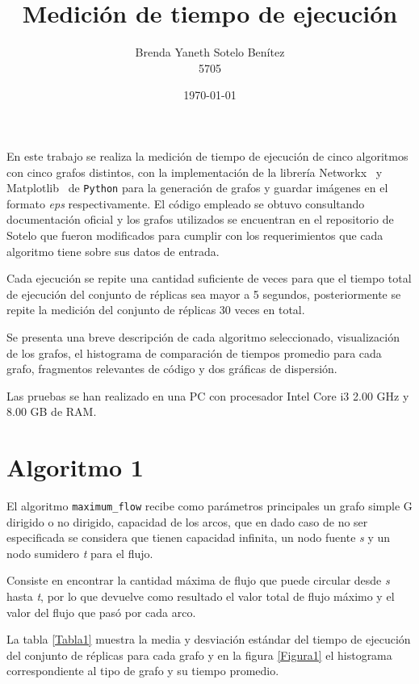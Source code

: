 \documentclass{article}
\title{\textbf{ Medición de tiempo de ejecución}}
\author{Brenda Yaneth Sotelo Benítez \\ 5705}
\date{\today}
\begin{document}
\maketitle
\renewcommand{\tablename}{Tabla}
En este trabajo se realiza la medición de tiempo de ejecución de cinco algoritmos con cinco grafos distintos, con la implementación de la librería \color{blue}Networkx\color{black}\ \cite{Net} y \color{blue}Matplotlib\color{black}\ \cite{Mat} de \texttt{Python} \cite{Python} para la generación de grafos y guardar imágenes en el formato \textit{eps} respectivamente. El código empleado se obtuvo consultando documentación oficial \cite{network}  y los grafos utilizados se encuentran en el repositorio de Sotelo \cite{BYSB} que fueron modificados para cumplir con los requerimientos que cada algoritmo tiene sobre sus datos de entrada.

Cada ejecución se repite una cantidad suficiente de veces para que el tiempo total de ejecución del conjunto de réplicas sea mayor a 5 segundos, posteriormente se repite la medición del conjunto de réplicas 30 veces en total. 

Se presenta una breve descripción de cada algoritmo seleccionado, visualización de los grafos, el histograma de comparación de tiempos promedio para cada grafo, fragmentos relevantes de código y dos gráficas de dispersión.

Las pruebas se han realizado en una PC con procesador Intel Core i3 2.00 GHz y 8.00 GB de RAM.

\newpage
\section*{Algoritmo 1}
El algoritmo \texttt{maximum\_flow} recibe como parámetros principales un grafo simple G dirigido o no dirigido, capacidad de los arcos, que en dado caso de no ser especificada se considera que tienen capacidad infinita, un nodo fuente \textit{s} y  un nodo sumidero \textit{t} para el flujo.

Consiste en encontrar la cantidad máxima de flujo que puede circular desde \textit{s} hasta \textit{t}, por lo que devuelve como resultado el valor total de flujo máximo y el valor del flujo que pasó por cada arco. 

La tabla \ref{Tabla1} muestra la media y desviación estándar del tiempo de ejecución del conjunto de réplicas para cada grafo y en la figura \ref{Figura1} el histograma correspondiente al tipo de grafo y su tiempo promedio.
\end{document}
